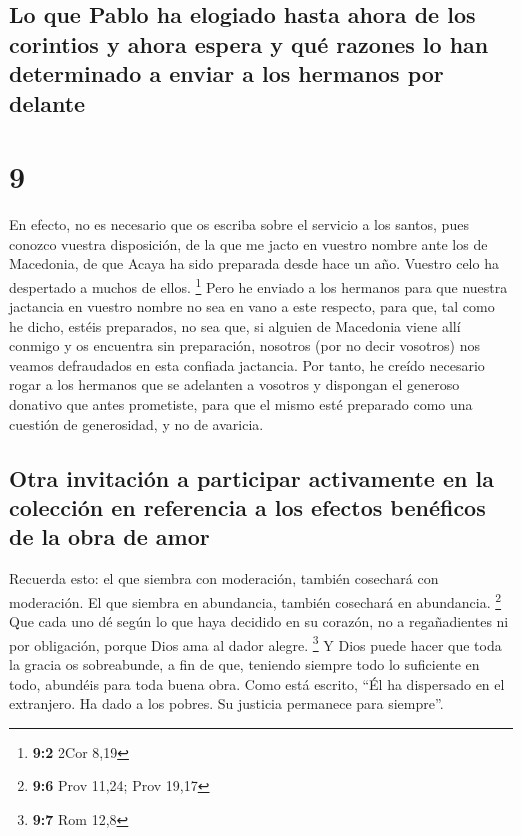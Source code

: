 \begin{paracol}{2}
\hypertarget{lo-que-pablo-ha-elogiado-hasta-ahora-de-los-corintios-y-ahora-espera-y-quuxe9-razones-lo-han-determinado-a-enviar-a-los-hermanos-por-delante}{%
\subsection{Lo que Pablo ha elogiado hasta ahora de los corintios y
ahora espera y qué razones lo han determinado a enviar a los hermanos
por
delante}\label{lo-que-pablo-ha-elogiado-hasta-ahora-de-los-corintios-y-ahora-espera-y-quuxe9-razones-lo-han-determinado-a-enviar-a-los-hermanos-por-delante}}

\hypertarget{section-16}{%
\section{9}\label{section-16}}

 En efecto, no es necesario que os escriba sobre el
servicio a los santos,  pues conozco vuestra disposición,
de la que me jacto en vuestro nombre ante los de Macedonia, de que Acaya
ha sido preparada desde hace un año. Vuestro celo ha despertado a muchos
de ellos. \footnote{\textbf{9:2} 2Cor 8,19}  Pero he
enviado a los hermanos para que nuestra jactancia en vuestro nombre no
sea en vano a este respecto, para que, tal como he dicho, estéis
preparados,  no sea que, si alguien de Macedonia viene
allí conmigo y os encuentra sin preparación, nosotros (por no decir
vosotros) nos veamos defraudados en esta confiada jactancia.
 Por tanto, he creído necesario rogar a los hermanos que
se adelanten a vosotros y dispongan el generoso donativo que antes
prometiste, para que el mismo esté preparado como una cuestión de
generosidad, y no de avaricia.

\hypertarget{otra-invitaciuxf3n-a-participar-activamente-en-la-colecciuxf3n-en-referencia-a-los-efectos-benuxe9ficos-de-la-obra-de-amor}{%
\subsection{Otra invitación a participar activamente en la colección en
referencia a los efectos benéficos de la obra de
amor}\label{otra-invitaciuxf3n-a-participar-activamente-en-la-colecciuxf3n-en-referencia-a-los-efectos-benuxe9ficos-de-la-obra-de-amor}}

 Recuerda esto: el que siembra con moderación, también
cosechará con moderación. El que siembra en abundancia, también
cosechará en abundancia. \footnote{\textbf{9:6} Prov 11,24; Prov 19,17}
 Que cada uno dé según lo que haya decidido en su corazón,
no a regañadientes ni por obligación, porque Dios ama al dador alegre.
\footnote{\textbf{9:7} Rom 12,8}  Y Dios puede hacer que
toda la gracia os sobreabunde, a fin de que, teniendo siempre todo lo
suficiente en todo, abundéis para toda buena obra.  Como
está escrito, ``Él ha dispersado en el extranjero. Ha dado a los pobres.
Su justicia permanece para siempre''.


\end{paracol}

